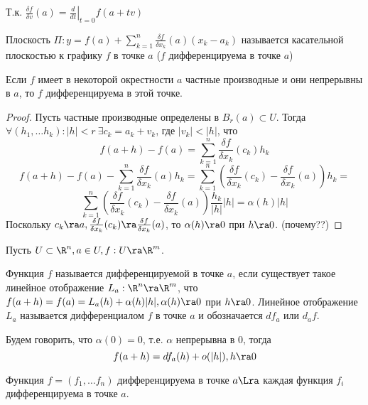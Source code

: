 \begin{note}
    Т.к. \(\frac{\delta f}{\delta v}(a) = \left.\frac{d}{dt}\right|_{t = 0}f(a + tv)\)
\end{note}

\begin{definition}
    Плоскость \(\Pi: y = f(a) + \sum_{k = 1}^n \frac{\delta f}{\delta x_k}(a)(x_k - a_k)\) называется касательной плоскостью к графику \(f\) в точке \(a\) (\(f\) дифференцируема в точке \(a\))
\end{definition}

\begin{theorem}
    Если \(f\) имеет в некоторой окрестности \(a\) частные производные и они непрерывны в \(a\), то \(f\) дифференцируема в этой точке.
\end{theorem}
\begin{proof}
    Пусть частные производные определены в \(B_r(a) \subset U\). Тогда \(\forall (h_1, \dots h_k): |h| < r\ \exists c_k = a_k + v_k\), где \(|v_k| < |h|\), что
    \[f(a + h) - f(a) = \sum_{k = 1}^n \frac{\delta f}{\delta x_k}(c_k)h_k\]
    \[f(a + h) - f(a) - \sum_{k = 1}^n \frac{\delta f}{\delta x_k}(a)h_k = \sum_{k = 1}^n \left(\frac{\delta f}{\delta x_k}(c_k) - \frac{\delta f}{\delta x_k}(a)\right)h_k =\]
    \[\sum_{k = 1}^n\left(\frac{\delta f}{\delta x_k}(c_k) - \frac{\delta f}{\delta x_k}(a)\right) \frac{h_k}{|h|}|h| = \alpha(h)|h|\]
    Поскольку \(c_k \ra a, \frac{\delta f}{\delta x_k}(c_k) \ra \frac{\delta f}{\delta x_k}(a)\), то \(
    \alpha(h) \ra 0\) при \(h \ra 0\). (почему??)
\end{proof}

Пусть \(U \subset \R^n, a \in U, f: U \ra \R^m\).

\begin{definition}
    Функция \(f\) называется дифференцируемой в точке \(a\), если существует такое линейное отображение \(L_a: \R^n \ra \R^m\), что \(f(a + h) = f(a) = L_a(h) + \alpha(h)|h|, \alpha(h) \ra 0\) при \(h \ra 0\). Линейное отображение \(L_a\) называется дифференциалом \(f\) в точке \(a\) и обозначается \(df_a\) или \(d_af\). 
\end{definition}

\begin{note}
    Будем говорить, что \(\alpha(0) = 0\), т.е. \(\alpha\) непрерывна в \(0\), тогда
    \[f(a + h) = df_a(h) + o(|h|), h \ra 0\]
\end{note}

\begin{lemma}
    Функция \(f = (f_1, \dots f_n)\) дифференцируема в точке \(a \Lra \) каждая функция \(f_i\) дифференцируема в точке \(a\).
\end{lemma}


